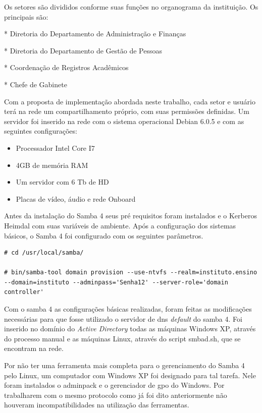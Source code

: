 \pagebreak
          				
Os setores são divididos conforme suas funções no organograma da instituição. Os principais são:

* Diretoria do Departamento de Administração e Finanças

* Diretoria do Departamento de Gestão de Pessoas

* Coordenação de Registros Acadêmicos

* Chefe de Gabinete

Com a proposta de implementação abordada neste trabalho, cada setor e usuário terá na rede um compartilhamento próprio, com suas permissões definidas. Um servidor foi inserido na rede com o sistema operacional Debian 6.0.5 e com as seguintes configurações:

\begin{itemize}
	\item{Processador Intel Core I7\textregistered}
	\item{4GB de memória RAM}
	\item{Um servidor com 6 Tb de HD}
	\item{Placas de vídeo, áudio e rede Onboard}
\end{itemize}

Antes da instalação do Samba 4 seus pré requisitos foram instalados e o Kerberos Heimdal com suas variáveis de ambiente.
Após a configuração dos sistemas básicos, o Samba 4 foi configurado com os seguintes parâmetros.\\

\begin{lstlisting}
# cd /usr/local/samba/

# bin/samba-tool domain provision --use-ntvfs --realm=instituto.ensino --domain=instituto --adminpass='Senha12' --server-role='domain controller'
\end{lstlisting}

Com o samba 4 as configurações básicas realizadas, foram feitas as modificações necessárias para que fosse utilizado o servidor de dns \textit{default} do samba 4. Foi inserido no domínio do \textit{Active Directory} todas as máquinas Windows XP, através do processo manual e as máquinas Linux, através do script smbad.sh, que se encontram na rede.

Por não ter uma ferramenta mais completa para o gerenciamento do Samba 4 pelo Linux, um computador com Windows XP foi designado para tal tarefa. Nele foram instalados o adminpack e o gerenciador de gpo do Windows. Por trabalharem com o mesmo protocolo como já foi dito anteriormente não houveram incompatibilidades na utilização das ferramentas.

